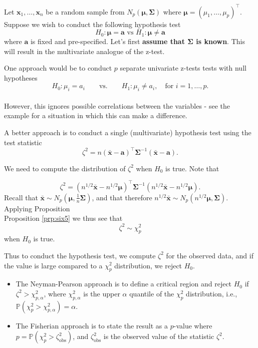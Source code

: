 \documentclass[
]{book}
\theoremstyle{definition}
\theoremstyle{definition}
\theoremstyle{definition}
\theoremstyle{definition}
\theoremstyle{remark}
\begin{document}
Let \(\mathbf x_1,\ldots,\mathbf x_n\) be a random sample from \(N_p({\boldsymbol{\mu}},\boldsymbol{\Sigma})\) where
\({\boldsymbol{\mu}}= (\mu_1,\ldots,\mu_p)^\top\). Suppose we wish to conduct the following hypothesis test \[H_0: {\boldsymbol{\mu}}= \mathbf a\mbox{ vs } H_1: {\boldsymbol{\mu}}\neq \mathbf a\] where \(\mathbf a\) is fixed and pre-specified.
Let's first \textbf{assume that \(\boldsymbol{\Sigma}\) is known}. This will result in the multivariate analogue of the z-test.

One approach would be to conduct \(p\) separate univariate z-tests tests with null hypotheses
\[H_0: \mu_i = a_i \qquad \text{vs.} \qquad H_1: \mu_i \neq a_i, \quad \mbox{for } i=1,\ldots,p.\]\\
However, this ignores possible correlations between the variables - see the example for a situation in which this can make a difference.

A better approach is to conduct a single (multivariate) hypothesis test using the test statistic
\[
\zeta^2 = n(\bar{\mathbf x}-\mathbf a)^\top \boldsymbol{\Sigma}^{-1} (\bar{\mathbf x}-\mathbf a).
\]

We need to compute the distribution of \(\zeta^2\) when \(H_0\) is true. Note that

\[
\zeta^2 = (n^{1/2}\bar{\mathbf x}-n^{1/2}{\boldsymbol{\mu}})^\top \boldsymbol{\Sigma}^{-1} (n^{1/2}\bar{\mathbf x}-n^{1/2}{\boldsymbol{\mu}}).
\]
Recall that \(\bar{\mathbf x} \sim N_p({\boldsymbol{\mu}}, \frac{1}{n} \boldsymbol{\Sigma})\), and that therefore \(n^{1/2} \bar{\mathbf x} \sim N_p(n^{1/2} {\boldsymbol{\mu}}, \boldsymbol{\Sigma})\). Applying Proposition\\
Proposition \ref{prp:six5} we thus see that
\[\zeta^2\sim \chi_p^2\]
when \(H_0\) is true.

Thus to conduct the hypothesis test, we compute \(\zeta^2\) for the observed data, and if the value is large compared to a \(\chi^2_p\) distribution, we reject \(H_0\).

\begin{itemize}
\item
  The Neyman-Pearson approach is to define a critical region and reject \(H_0\) if \(\zeta^2 > \chi^2_{p,\alpha}\), where \(\chi^2_{p,\alpha}\) is the upper \(\alpha\) quantile of the \(\chi^2_p\) distribution, i.e., \(\mathbb{P}(\chi^2_p > \chi^2_{p,\alpha})=\alpha\).
\item
  The Fisherian approach is to state the result as a \(p\)-value where \(p = \mathbb{P}(\chi^2_p > \zeta_{\text{obs}}^2)\), and
  \(\zeta_{\text{obs}}^2\) is the observed value of the statistic \(\zeta^2\).
\end{itemize}
\end{document}
